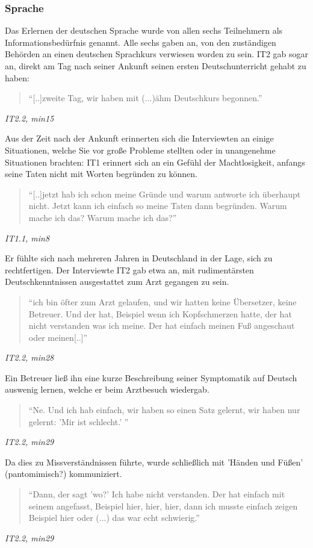 \subsubsection{Sprache}

Das Erlernen der deutschen Sprache wurde von allen sechs Teilnehmern als Informationsbedürfnis genannt. Alle sechs gaben an, von den zuständigen Behörden an einen deutschen Sprachkurs verwiesen worden zu sein. IT2 gab sogar an, direkt am Tag nach seiner Ankunft seinen ersten Deutschunterricht gehabt zu haben:
\begin{quote}
    ``[..]zweite Tag, wir haben mit (...)ähm Deutschkurs begonnen.''
\end{quote}
\centerline{\textit{IT2.2, min15}}
Aus der Zeit nach der Ankunft erinnerten sich die Interviewten an einige Situationen, welche Sie vor große Probleme stellten oder in unangenehme Situationen brachten:\newline
IT1 erinnert sich an ein Gefühl der Machtlosigkeit, anfangs seine Taten nicht mit Worten begründen zu können.
\begin{quote}
    ``[..]jetzt hab ich schon meine Gründe und warum antworte ich überhaupt nicht. Jetzt kann ich einfach so meine Taten dann begründen. Warum mache ich das? Warum mache ich das?''
\end{quote}
\centerline{\textit{IT1.1, min8}}
Er fühlte sich nach mehreren Jahren in Deutschland in der Lage, sich zu rechtfertigen.\newline
Der Interviewte IT2 gab etwa an, mit rudimentärsten Deutschkenntnissen ausgestattet zum Arzt gegangen zu sein. 
\begin{quote}
    ``ich bin öfter zum Arzt gelaufen, und wir hatten keine Übersetzer, keine Betreuer. Und der hat, Beispiel wenn ich Kopfschmerzen hatte, der hat nicht verstanden was ich meine. Der hat einfach meinen Fuß angeschaut oder meinen[..]''
\end{quote}
\centerline{\textit{IT2.2, min28}}
Ein Betreuer ließ ihn eine kurze Beschreibung seiner Symptomatik auf Deutsch auswenig lernen, welche er beim Arztbesuch wiedergab. 
\begin{quote}
    ``Ne. Und ich hab einfach, wir haben so einen Satz gelernt, wir haben nur gelernt: 'Mir ist schlecht.' ''
\end{quote}
\centerline{\textit{IT2.2, min29}}
Da dies zu Missverständnissen führte, wurde schließlich mit 'Händen und Füßen' (pantomimisch?) kommuniziert.\newline
\begin{quote}
    ``Dann, der sagt 'wo?' Ich habe nicht verstanden. Der hat einfach mit seinem angefasst, Beispiel hier, hier, hier, dann ich musste einfach zeigen Beispiel hier oder (...) das war echt schwierig.''
\end{quote}
\centerline{\textit{IT2.2, min29}}


